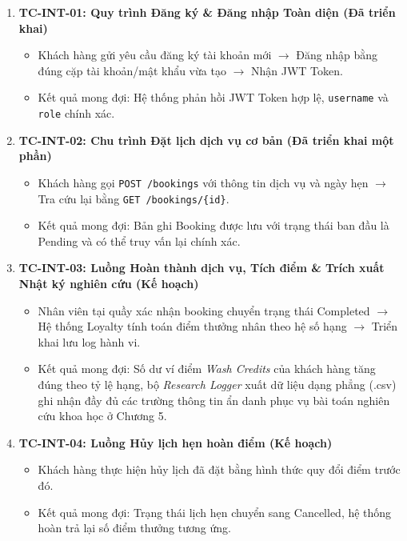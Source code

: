 \begin{enumerate}
    \item \textbf{TC-INT-01: Quy trình Đăng ký \& Đăng nhập Toàn diện (Đã triển khai)}
    \begin{itemize}
        \item Khách hàng gửi yêu cầu đăng ký tài khoản mới $\rightarrow$ Đăng nhập bằng đúng cặp tài khoản/mật khẩu vừa tạo $\rightarrow$ Nhận JWT Token.
        \item Kết quả mong đợi: Hệ thống phản hồi JWT Token hợp lệ, \texttt{username} và \texttt{role} chính xác.
    \end{itemize}

    \item \textbf{TC-INT-02: Chu trình Đặt lịch dịch vụ cơ bản (Đã triển khai một phần)}
    \begin{itemize}
        \item Khách hàng gọi \texttt{POST /bookings} với thông tin dịch vụ và ngày hẹn $\rightarrow$ Tra cứu lại bằng \texttt{GET /bookings/\{id\}}.
        \item Kết quả mong đợi: Bản ghi Booking được lưu với trạng thái ban đầu là Pending và có thể truy vấn lại chính xác.
    \end{itemize}

    \item \textbf{TC-INT-03: Luồng Hoàn thành dịch vụ, Tích điểm \& Trích xuất Nhật ký nghiên cứu (Kế hoạch)}
    \begin{itemize}
        \item Nhân viên tại quầy xác nhận booking chuyển trạng thái Completed $\rightarrow$ Hệ thống Loyalty tính toán điểm thưởng nhân theo hệ số hạng $\rightarrow$ Triển khai lưu log hành vi.
        \item Kết quả mong đợi: Số dư ví điểm \textit{Wash Credits} của khách hàng tăng đúng theo tỷ lệ hạng, bộ \textit{Research Logger} xuất dữ liệu dạng phẳng (.csv) ghi nhận đầy đủ các trường thông tin ẩn danh phục vụ bài toán nghiên cứu khoa học ở Chương 5.
    \end{itemize}

    \item \textbf{TC-INT-04: Luồng Hủy lịch hẹn hoàn điểm (Kế hoạch)}
    \begin{itemize}
        \item Khách hàng thực hiện hủy lịch đã đặt bằng hình thức quy đổi điểm trước đó.
        \item Kết quả mong đợi: Trạng thái lịch hẹn chuyển sang Cancelled, hệ thống hoàn trả lại số điểm thưởng tương ứng.
    \end{itemize}
\end{enumerate}

